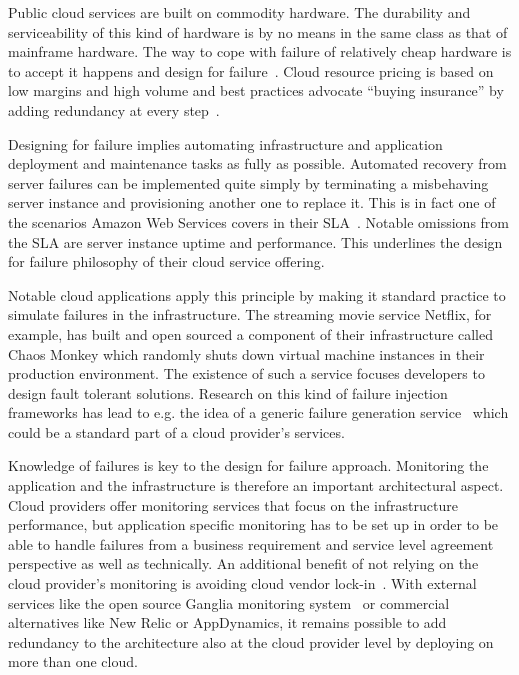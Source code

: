 \documentclass[english]{tktltiki2}
\theoremstyle{definition}
\theoremstyle{remark}
\begin{document}
Public cloud services are built on commodity hardware. The durability and
serviceability of this kind of hardware is by no means in the same class as that
of mainframe hardware. The way to cope with failure of relatively cheap hardware
is to accept it happens and design for
failure~\cite{cloudarchitecturepatternsbook}. Cloud resource pricing is based on
low margins and high volume and best practices advocate ``buying insurance'' by
adding redundancy at every step~\cite{Varia2010}.

Designing for failure implies automating infrastructure and application
deployment and maintenance tasks as fully as possible. Automated recovery from
server failures can be implemented quite simply by terminating a misbehaving
server instance and provisioning another one to replace it. This is in fact one
of the scenarios Amazon Web Services covers in their SLA~\cite{ec2sla}. Notable
omissions from the SLA are server instance uptime and performance. This
underlines the design for failure philosophy of their cloud service offering.

Notable cloud applications apply this principle by making it standard practice
to simulate failures in the infrastructure. The streaming movie service Netflix,
for example, has built and open sourced a component of their infrastructure
called Chaos Monkey which randomly shuts down virtual machine instances in their
production environment. The existence of such a service focuses developers to
design fault tolerant solutions. Research on this kind of failure injection
frameworks has lead to e.g. the idea of a generic failure generation
service~\cite{FAASBerkeleyTechRep} which could be a standard part of a cloud
provider's services.

Knowledge of failures is key to the design for failure approach. Monitoring the
application and the infrastructure is therefore an important architectural
aspect. Cloud providers offer monitoring services that focus on the
infrastructure performance, but application specific monitoring has to be set up
in order to be able to handle failures from a business requirement and service
level agreement perspective as well as technically. An additional benefit of not
relying on the cloud provider's monitoring is avoiding cloud vendor 
lock-in~\cite{Petcu2012}. With external services like the open source Ganglia
monitoring system~\cite{gangliapaper} or commercial alternatives like New Relic
or AppDynamics, it remains possible to add redundancy to the architecture also
at the cloud provider level by deploying on more than one cloud.
\end{document}
